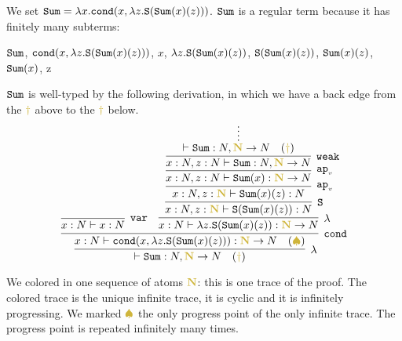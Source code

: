 \documentclass{article}
\begin{document}
\begin{Eg}
\label{example-sum}
We set ${\tt Sum} = \lambda x.{\tt cond}(x,\lambda z.{\tt S}({\tt Sum}(x)(z)))$.
${\tt Sum}$ is a regular term because it has finitely many subterms: 
\begin{center}
  ${\tt Sum}$,
  \quad
  ${\tt cond}(x,\lambda z.{\tt S}({\tt Sum}(x)(z)))$,
  \quad
  $x$,
  \quad
  $\lambda z.{\tt S}({\tt Sum}(x)(z))$,
 \quad
  ${\tt S}({\tt Sum}(x)(z))$,
  \quad
  ${\tt Sum}(x)(z)$,
  \quad
  ${\tt Sum}(x)$,
  \quad
   z
\end{center}
${\tt Sum}$ is well-typed by the following derivation, in which we have a back edge from the 
$\bfColor{oldgold}{\dagger}$ above to the $\bfColor{oldgold}{\dagger}$ below.
\[
\infer[\lambda]{
  \vdash \Sum:\N, \bfColor{oldgold}{\N} \rightarrow \N 
   \quad (\bfColor{oldgold}{\dagger})
}{
  \infer[\cond]{
    x : \N \vdash 
    \cond(x,\lambda z.\Succ(\Sum(x)(z))): \bfColor{oldgold}{\N} \rightarrow \N
     \quad (\bfColor{oldgold}{ \spadesuit})
  }{
    \infer[\var]{
      x : \N \vdash x : \N
    }{}
    &
    \infer[\lambda]{
      x:\N \vdash \lambda z.\Succ(\Sum(x)(z)): \bfColor{oldgold}{\N} \rightarrow \N  
    }{
      \infer[\Succ]{
        x:\N, z : \bfColor{oldgold}{\N} 
        \vdash \Succ(\Sum(x)(z)): \N  
      }{
        \infer[\apvar]{
          x:\N, z : \bfColor{oldgold}{\N} 
          \vdash \Sum(x)(z): \N
        }{
          \infer[\apvar]{
            x:\N, z : \N
            \vdash \Sum(x): \bfColor{oldgold}{\N} \rightarrow \N
          }{
            \infer[\weak]{
              x:\N, z : \N
              \vdash \Sum: \N, \bfColor{oldgold}{\N} \rightarrow  \N
            }{
              \infer*{\vdash \Sum: \N, \bfColor{oldgold}{\N} \rightarrow \N 
                \quad (\bfColor{oldgold}{\dagger})}{}
            }
          }
        }
      }
    }
  }
}
\]
\end{Eg}

We colored in  one sequence of atoms $\bfColor{oldgold}{\N}$:
this is one trace of the proof.
The colored trace is the unique infinite trace, it is cyclic and it is infinitely progressing.
We marked $\bfColor{oldgold}{ \spadesuit}$ the only progress point of the only infinite trace.
The progress point is repeated infinitely many times.


%
\end{document}
